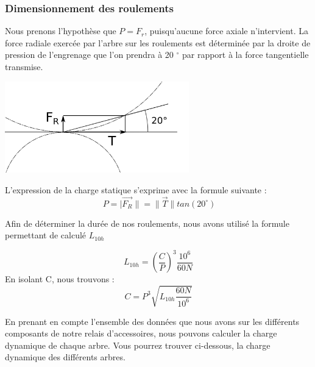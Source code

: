 \documentclass{config}
\begin{document}
\begin{spacing}{1.2}
\subsubsection{Dimensionnement des roulements}

Nous prenons l'hypothèse que $P = F_r$, puisqu'aucune force axiale n'intervient.
La force radiale exercée par l'arbre sur les roulements est déterminée par la droite de pression de l'engrenage que l'on prendra à 20 $^\circ{}$ par rapport à la force tangentielle transmise.

\begin{center}
\includegraphics[width=0.6\textwidth]{Droite_de_pression.png}
\end{center}

L'expression de la charge statique s'exprime avec la formule suivante :
\[\ P = | \vec{F_R} \| = \| \vec{T} \| tan(20^\circ{})\]

Afin de déterminer la durée de nos roulements, nous avons utilisé la formule permettant de calculé $L_{10h}$

\[L_{10h} = (\frac{C}{P})^3 \frac{10^6}{60N}  \]
En isolant C, nous trouvons :
\[C = P^3\sqrt{L_{10h} \frac{60N}{10^6}}  \]

En prenant en compte l'ensemble des données que nous avons sur les différents composants de notre relais d'accessoires, nous pouvons calculer la charge dynamique de chaque arbre. Vous pourrez trouver ci-dessous, la charge dynamique des différents arbres.

\begin{table}[h]
\centering
{}
\end{table}


\end{spacing}
\end{document}
